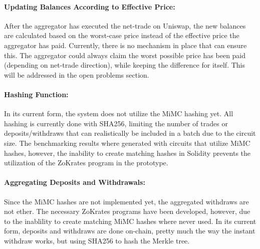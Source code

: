 \documentclass[../../thesis.tex]{subfiles}
\begin{document}
\paragraph{Updating Balances According to Effective Price:}
After the aggregator has executed the net-trade on Uniswap, the new balances are calculated based on the worst-case price instead of the effective price the aggregator has paid. Currently, there is no mechanism in place that can ensure this. The aggregator could always claim the worst possible price has been paid (depending on net-trade direction), while keeping the difference for itself. This will be addressed in the open problems section.

\paragraph{Hashing Function:}
In its current form, the system does not utilize the MiMC hashing yet. All hashing is currently done with SHA256, limiting the number of trades or deposits/withdraws that can realistically be included in a batch due to the circuit size. The benchmarking results where generated with circuits that utilize MiMC hashes, however, the inability to create matching hashes in Solidity prevents the utilization of the ZoKrates program in the prototype. 

\paragraph{Aggregating Deposits and Withdrawals:}
Since the MiMC hashes are not implemented yet, the aggregated withdraws are not ether. The necessary ZoKrates programs have been developed, however, due to the inablility to create matching MiMC hashes where never used. In its current form, deposits and withdraws are done on-chain, pretty much the way the instant withdraw works, but using SHA256 to hash the Merkle tree.
\end{document}
